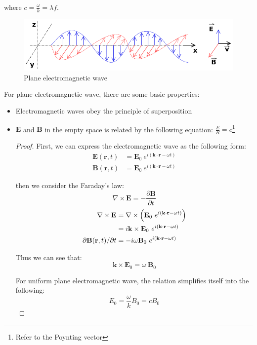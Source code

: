 \documentclass[openany]{book}
\begin{document}
where $c=\frac{\omega }{k}=\lambda f$. 
\begin{figure}[H]
\centering
\label{fig:8}
\includegraphics[scale=0.4]{Figure/8.PNG}
\caption{Plane electromagnetic wave}
\end{figure}
For plane electromagnetic wave, there are some basic properties:
\begin{itemize}
\item Electromagnetic waves obey the principle of superposition
\item $\mathbf{E}$ and $\mathbf{B}$ in the empty space is related by the following equation: $\frac{E}{B}=c$\footnote{Refer to the Poynting vector}

\begin{proof}
First, we can express the electromagnetic wave as the following form:
\begin{align*}
\mathbf{E}(\mathbf{r},t) &= \mathbf{E}_0 ~ e^{i(\mathbf{k}\cdot  \mathbf{r} - \omega t)}\\
\mathbf{B}(\mathbf{r},t) &= \mathbf{E}_0 ~ e^{i(\mathbf{k}\cdot  \mathbf{r} - \omega t)}
\end{align*}

then we consider the Faraday's law:
\[\nabla \times \mathbf{E}=-\frac{\partial \mathbf{B}}{\partial t}\]
\begin{align*}
\nabla \times \mathbf{E}&=\nabla \times \Bigl( \mathbf{E}_0 ~ e^{i(\mathbf{k}\cdot  \mathbf{r} - \omega t)} \Bigl)\\
&= i \mathbf{k}\times \mathbf{E}_0 ~ e^{i(\mathbf{k}\cdot  \mathbf{r} - \omega t)}\\
\partial \mathbf{B}(\mathbf{r},t) / \partial t&=- i \omega \mathbf{B}_0 ~ e^{i(\mathbf{k}\cdot  \mathbf{r} - \omega t)}
\end{align*}

Thus we can see that:
\[\mathbf{k} \times \mathbf{E}_0 = \omega ~ \mathbf{B}_0\]

For uniform plane electromagnetic wave, the relation simplifies itself into the following:
\[E_0=\frac{\omega }{k}B_0=cB_0\]
\end{proof}
\end{itemize}
\end{document}
